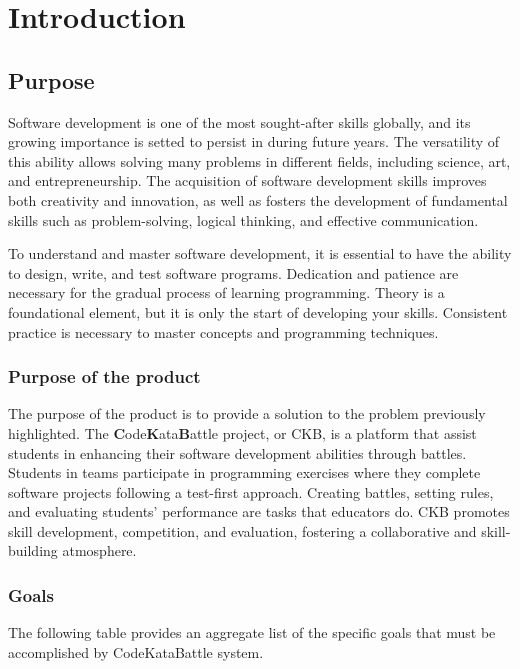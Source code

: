 \chapter{Introduction}

\section{Purpose}
Software development is one of the most sought-after skills globally, and its growing importance is setted to persist in during future years.
The versatility of this ability allows solving many problems in different fields, including science, art, and entrepreneurship.
The acquisition of software development skills improves both creativity and innovation, as well as fosters the development of fundamental skills such as problem-solving, logical thinking, and effective communication.

To understand and master software development, it is essential to have the ability to design, write, and test software programs.
Dedication and patience are necessary for the gradual process of learning programming.
Theory is a foundational element, but it is only the start of developing your skills. Consistent practice is necessary to master concepts and programming techniques.

\subsection{Purpose of the product}
The purpose of the product is to provide a solution to the problem previously highlighted.
The \textbf{C}ode\textbf{K}ata\textbf{B}attle project, or CKB, is a platform that assist students in enhancing their software development abilities through battles.
Students in teams participate in programming exercises where they complete software projects following a test-first approach.
Creating battles, setting rules, and evaluating students' performance are tasks that educators do.
CKB promotes skill development, competition, and evaluation, fostering a collaborative and skill-building atmosphere.

\subsection{Goals}
The following table provides an aggregate list of the specific goals that must be accomplished by CodeKataBattle system.

